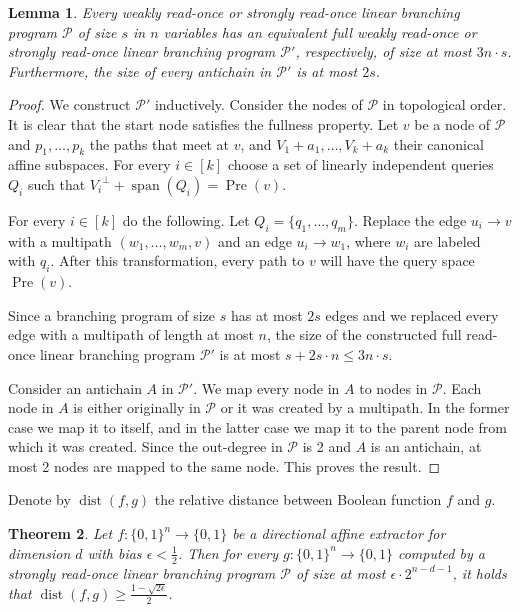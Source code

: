 \documentclass[10pt,a4paper]{article}
\newtheorem{theorem}{Theorem}
\newtheorem{lemma}[theorem]{Lemma}
\theoremstyle{definition}
\theoremstyle{remark}
\DeclareMathOperator{\dist}{dist}
\DeclareMathOperator{\Span}{span}
\DeclareMathOperator{\pre}{Pre}
\newcommand{\orth}[1]{{#1}^{\perp}}
\newcommand{\Q}{{\{0,1\}}}
\newcommand{\calP}{\mathcal{P}}
\newcommand{\sreadonce}{strongly read-once}
\newcommand{\wreadonce}{weakly read-once}
\newcommand{\readonce}{read-once}
\begin{document}
\begin{lemma}\label{lem:full_bp}
  Every \wreadonce{} or \sreadonce{} linear branching program $\calP$ of size $s$ in $n$ variables has an equivalent full \wreadonce{} or \sreadonce{} linear branching program $\calP'$, respectively, of size at most $3n \cdot s$. Furthermore, the size of every antichain in $\calP'$ is at most $2s$.
\end{lemma}
\begin{proof}
  We construct $\calP'$ inductively. Consider the nodes of $\calP$ in topological order. It is clear that the start node satisfies the fullness property. Let $v$ be a node of $\calP$ and $p_1, \ldots, p_k$ the paths that meet at $v$, and $V_1 + a_1, \ldots, V_k + a_k$ their canonical affine subspaces. 
  For every $i \in [k]$ choose a set of linearly independent queries $Q_i$ such that $\orth{V_i} + \Span(Q_i) = \pre(v)$.

  For every $i \in [k]$ do the following. Let $Q_i = \{q_1, \ldots, q_m\}$. Replace the edge $u_i \to v$ with a multipath $(w_1, \ldots, w_m, v)$ and an edge $u_i \to w_1$, where $w_i$ are labeled with $q_i$. After this transformation, every path to $v$ will have the query space $\pre(v)$.

  Since a branching program of size $s$ has at most $2s$ edges and we replaced every edge with a multipath of length at most $n$, the size of the constructed full \readonce{} linear branching program $\calP'$ is at most $s+2s \cdot n \le 3n \cdot s$.

  Consider an antichain $A$ in $\calP'$. We map every node in $A$ to nodes in $\calP$. Each node in $A$ is either originally in $\calP$ or it was created by a multipath. In the former case we map it to itself, and in the latter case we map it to the parent node from which it was created. Since the out-degree in $\calP$ is 2 and $A$ is an antichain, at most 2 nodes are mapped to the same node. This proves the result.
\end{proof}

Denote by $\dist(f,g)$ the relative distance between Boolean function $f$ and $g$.


\begin{theorem}\label{thm:avg_case_full}
  Let $f\colon \Q^n \to \Q$ be a directional affine extractor for dimension $d$ with bias $\epsilon < \frac{1}{2}$. Then for every $g\colon \Q^n \to \Q$ computed by a \sreadonce{} linear branching program $\calP$ of size at most $\epsilon \cdot 2^{n-d-1}$, it holds that $\dist(f, g) \ge \frac{1-\sqrt{2\epsilon}}{2}$.
\end{theorem}
\end{document}
